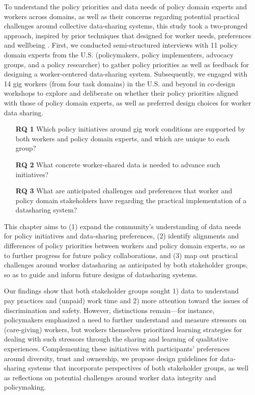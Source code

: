 To understand the {policy priorities and} data needs of {policy domain experts and workers across domains,} as well as their {concerns regarding potential practical challenges around} collective data-sharing systems, this study took a two-pronged approach{, inspired by} {prior techniques that designed} for worker needs, preferences and wellbeing \cite{dillahunt2018designing, spektor2023designing}. First, we conducted semi-structured interviews with 11 policy domain experts from the U.S. (policymakers, policy implementers, advocacy groups, and a policy researcher) to gather policy priorities as well as feedback for designing a worker-centered data-sharing system. Subsequently, we engaged with 14 gig workers (from four task domains) in the U.S. and beyond in co-design workshops to explore and deliberate on {whether their policy priorities aligned with those of policy domain experts, as well as preferred design choices for worker data sharing}. 

\begin{enumerate}
\item[\textbf{RQ 1}] {Which policy initiatives around gig work conditions are supported by both workers and policy domain experts, and which are unique to each group?}  

\item[\textbf{RQ 2}] What {concrete} worker-{shared} data is needed to {advance such initiatives}?

\item [\textbf{RQ 3}] {What are anticipated challenges and preferences that worker and policy domain stakeholders have regarding the practical implementation of a datasharing system?}

\end{enumerate}

This chapter aims to
(1) expand the community's understanding of data needs for policy initiatives and data-sharing preferences, 
(2) identify alignments and differences of policy priorities between workers and policy domain experts, so as to further progress for future policy collaborations, and 
(3) map out practical challenges around worker datasharing as anticipated by both stakeholder groups, so as to guide and inform future designs of datasharing systems.

Our findings show that both stakeholder groups sought 1) data to understand pay practices and (unpaid) work time and 2) more attention toward the issues of discrimination and safety. However, distinctions remain---for instance, policymakers emphasized a need {to further understand and measure stressors on (care-giving) workers,} {but workers themselves} {prioritized learning} strategies {for dealing with such stressors} through the sharing and learning of qualitative experiences. 
Complementing these initiatives with participants' preferences around diversity, trust and ownership, we propose design guidelines for data-sharing systems that incorporate perspectives of both stakeholder groups, as well as reflections on potential challenges around worker data integrity and policymaking.

